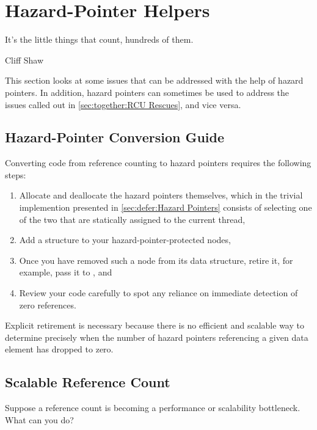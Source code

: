 
\section{Hazard-Pointer Helpers}
\label{sec:together:Hazard-Pointer Helpers}
%
\epigraph{It's the little things that count, hundreds of them.}
	 {Cliff Shaw}

This section looks at some issues that can be addressed with the
help of hazard pointers.
In addition, hazard pointers can sometimes be used to address the
issues called out in \cref{sec:together:RCU Rescues}, and vice versa.

\subsection{Hazard-Pointer Conversion Guide}
\label{sec:together:Hazard-Pointer Conversion Guide}

Converting code from reference counting to hazard pointers requires
the following steps:

\begin{enumerate}
\item	Allocate and deallocate the hazard pointers themselves, which
	in the trivial implemention presented in
	\cref{sec:defer:Hazard Pointers}
	consists of selecting one of the two that are statically assigned
	to the current thread,
\item	Add a  structure to your hazard-pointer-protected
	nodes,
\item	Once you have removed such a node from its data structure,
	retire it, for example, pass it to , and
\item	Review your code carefully to spot any reliance on immediate
	detection of zero references.
\end{enumerate}

Explicit retirement is necessary because there is no efficient and
scalable way to determine precisely when the number of hazard pointers
referencing a given data element has dropped to zero.

\subsection{Scalable Reference Count}
\label{sec:together:Scalable Reference Count}

Suppose a reference count is becoming a performance or scalability
bottleneck.
What can you do?

